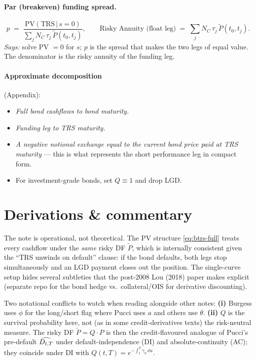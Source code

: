 \documentclass[11pt,a4paper]{article}
\begin{document}
\paragraph{Par (breakeven) funding spread.}
\begin{equation}\label{eq:btrs-par-spread}
  p \;=\; \frac{\mathrm{PV}(\mathrm{TRS}\,|\,s=0)}{\sum_j N_C\, \tau_j\, \widetilde P(t_0, t_j)},
  \qquad
  \text{Risky Annuity (float leg)} \;=\; \sum_j N_C\, \tau_j\, \widetilde P(t_0, t_j).
\end{equation}
\textit{Says:} solve PV $= 0$ for $s$; $p$ is the spread that makes
the two legs of equal value. The denominator is the risky annuity of
the funding leg.

\paragraph{Approximate decomposition} (Appendix):
\begin{itemize}[noitemsep]
  \item \textit{Full bond cashflows to bond maturity.}
  \item \textit{Funding leg to TRS maturity.}
  \item \textit{A negative notional exchange equal to the current
        bond price paid at TRS maturity} --- this is what represents
        the short performance leg in compact form.
  \item For investment-grade bonds, set $Q \equiv 1$ and drop LGD.
\end{itemize}

\section{Derivations \& commentary}

\begin{commentary}
The note is operational, not theoretical. The PV structure
\eqref{eq:btrs-full} treats every cashflow under the \emph{same}
risky DF $\widetilde P$, which is internally consistent given the
``TRS unwinds on default'' clause: if the bond defaults, both legs
stop simultaneously and an LGD payment closes out the position. The
single-curve setup hides several subtleties that the post-2008
Lou (2018) paper makes explicit (separate repo for the bond hedge
vs.\ collateral/OIS for derivative discounting).
\end{commentary}

\begin{commentary}
Two notational conflicts to watch when reading alongside other notes:
\textbf{(i)} Burgess uses $\phi$ for the long/short flag where Pucci
uses $a$ and others use $\theta$. \textbf{(ii)} $Q$ is the survival
probability here, not (as in some credit-derivatives texts) the
risk-neutral measure. The risky DF
$\widetilde P = Q \cdot P$ is then the credit-flavoured analogue of
Pucci's pre-default $\widehat{D_{t,T}}$ under default-independence
(DI) and absolute-continuity (AC); they coincide under DI with
$Q(t,T) = e^{-\int_t^T \gamma_u\,\dd u}$.
\end{commentary}
\end{document}
